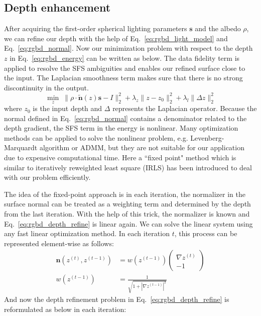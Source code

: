 \subsection{Depth enhancement}
After acquiring the first-order spherical lighting parameters $\mathbf{s}$ and the albedo $\rho$, we can refine our depth with the help of Eq.~\ref{eq:rgbd_light_model} and Eq.~\ref{eq:rgbd_normal}.
Now our minimization problem with respect to the depth $z$ in Eq.~\ref{eq:rgbd_energy} can be written as below. 
The data fidelity term is applied to resolve the SFS ambiguities and enables our refined surface close to the input. The Laplacian smoothness term makes sure that there is no strong discontinuity in the output. 
\begin{equation}\label{eq:rgbd_depth_refine}
    \min_{z} \; \lVert \rho \cdot \tilde{\mathbf{n}}(z) \mathbf{s} - I \rVert^2_2 + \lambda_z \lVert z - z_0\rVert^2_2 + \lambda_l \lVert \Delta z \rVert^2_2
\end{equation}
where $z_0$ is the input depth and $\Delta$ represents the  Laplacian operator. 
Because the normal defined in Eq.~\ref{eq:rgbd_normal} contains a denominator related to the depth gradient, the SFS term in the energy is nonlinear. 
Many optimization methods can be applied to solve the nonlinear problem, e.g. Levenberg-Marquardt algorithm or ADMM, but they are not suitable for our application due to expensive computational time. 
Here a ``fixed point" method which is similar to iteratively reweighted least square (IRLS) has been introduced to deal with our problem efficiently. 

The idea of the fixed-point approach is in each iteration, the normalizer in the surface normal can be treated as a weighting term and determined by the depth from the last iteration.
With the help of this trick, the normalizer is known and Eq.~\ref{eq:rgbd_depth_refine} is linear again.
We can solve the linear system using any fast linear optimization method.
In each iteration $t$, this process can be represented element-wise as follows:
\begin{equation}
    \begin{split}
        \mathbf{n}(z^{(t)}, z^{(t-1)}) &= w(z^{(t-1)})
        \begin{pmatrix} 
             \nabla z^{(t)}\\ 
             -1
             \end{pmatrix}\\
             w(z^{(t-1)}) &=  \frac{1}{\sqrt{1 + |\nabla z^{(t-1)}|^2}}
    \end{split}
\end{equation}
And now the depth refinement problem in Eq.~\ref{eq:rgbd_depth_refine} is reformulated as below in each iteration:


